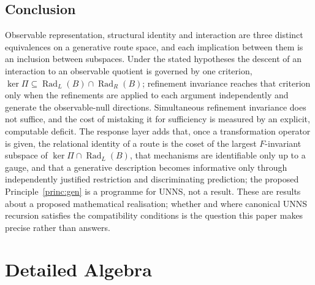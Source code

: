 \documentclass[11pt,a4paper]{article}
\newcommand{\Rad}{\operatorname{Rad}}
\theoremstyle{plain}
\theoremstyle{definition}
\begin{document}
\subsection{Conclusion}
Observable representation, structural identity and interaction are three distinct equivalences on a generative route space, and each implication between them is an inclusion between subspaces. Under the stated hypotheses the descent of an interaction to an observable quotient is governed by one criterion, $\ker\Pi\subseteq\Rad_L(B)\cap\Rad_R(B)$; refinement invariance reaches that criterion only when the refinements are applied to each argument independently and generate the observable-null directions. Simultaneous refinement invariance does not suffice, and the cost of mistaking it for sufficiency is measured by an explicit, computable deficit. The response layer adds that, once a transformation operator is given, the relational identity of a route is the coset of the largest $F$-invariant subspace of $\ker\Pi\cap\Rad_L(B)$, that mechanisms are identifiable only up to a gauge, and that a generative description becomes informative only through independently justified restriction and discriminating prediction; the proposed Principle~\ref{princ:gen} is a programme for UNNS, not a result. These are results about a proposed mathematical realisation; whether and where canonical UNNS recursion satisfies the compatibility conditions is the question this paper makes precise rather than answers.

\appendix
\section{Detailed Algebra}\label{app:algebra}
\end{document}
